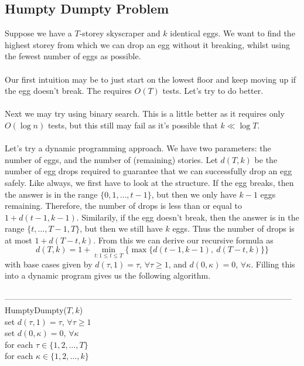 \documentclass{article}
\newcommand{\ka}{\kappa}
\begin{document}
\subsection{Humpty Dumpty Problem}
Suppose we have a $T$-storey skyscraper and $k$ identical eggs. We want to find the highest storey from which we can drop an egg without it breaking, whilst using the fewest number of eggs as possible.\\\\
Our first intuition may be to just start on the lowest floor and keep moving up if the egg doesn't break. The requires $O(T)$ tests. Let's try to do better.\\\\
Next we may try using binary search. This is a little better as it requires only $O(\log n)$ tests, but this still may fail as it's possible that $k \ll \log T$.\\\\
Let's try a dynamic programming approach. We have two parameters: the number of eggs, and the number of (remaining) stories. Let $d(T, k)$ be the number of egg drops required to guarantee that we can successfully drop an egg safely. Like always, we first have to look at the structure. If the egg breaks, then the answer is in the range $\{0, 1, \dots, t-1\}$, but then we only have $k-1$ eggs remaining. Therefore, the number of drops is less than or equal to $1 + d(t-1, k-1)$. Similarily, if the egg doesn't break, then the answer is in the range $\{t, \dots, T-1, T\}$, but then we still have $k$ eggs. Thus the number of drops is at most $1 + d(T-t, k)$. From this we can derive our recursive formula as
\[d(T, k) = 1 + \min_{t : 1\leq t \leq T}\{\max\{d(t-1, k-1),\ d(T-t, k)\}\}\]
with base cases given by $d(\tau, 1) = \tau$, $\forall \tau \geq 1$, and $d(0, \ka) = 0$, $\forall \ka$. Filling this into a dynamic program gives us the following algorithm.\\\\
---------------------------------------------------------------------------------------------------------
HumptyDumpty($T, k$)\\
	\hspace*{7mm} set $d(\tau, 1) = \tau$, $\forall \tau \geq 1$\\
	\hspace*{7mm} set $d(0, \ka) = 0$, $\forall \ka$\\
	\hspace*{7mm} for each $\tau \in \{1, 2, \dots, T\}$\\
	\hspace*{14mm} for each $\ka \in \{1, 2, \dots, k\}$\\
\end{document}
